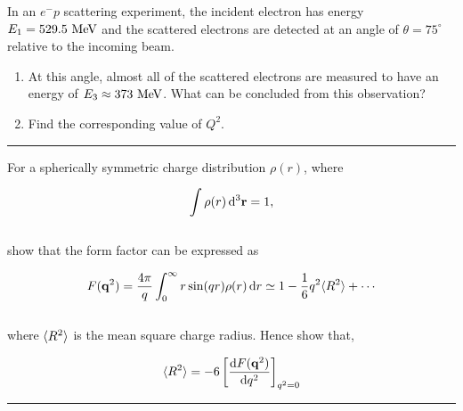 \begin{problem}{7.3}
    In an $e^-p$ scattering experiment, the incident electron has energy $E_1 = 529.5 \text{ MeV}$ and the scattered electrons are detected at an angle of $\theta = 75^\circ$ relative to the incoming beam.
    \begin{enumerate}[label=(\alph*)]
        \item At this angle, almost all of the scattered electrons are measured to have an energy of $E_3 \approx 373 \text{ MeV}$. What can be concluded from this observation?
        \item Find the corresponding value of $Q^2$.
    \end{enumerate}
\end{problem}
\begin{solution}

\end{solution}

\noindent\rule{7in}{1.5pt}


\begin{problem}{7.4}
    For a spherically symmetric charge distribution $\rho(r)$, where

    \begin{align*}
        \int \rho(r) \mathop{}\!\mathrm{d}^3 \mathbf{r} = 1,
    \end{align*}\\
    show that the form factor can be expressed as

    \begin{align*}
        F(\mathbf{q}^2) = \frac{4\pi}{q} \int^\infty_0 r \sin(qr) \rho(r) \mathop{}\!\mathrm{d} r \simeq 1 -\frac{1}{6}q^2\langle R^2 \rangle + \cdots
    \end{align*}\\
    where $\langle R^2 \rangle$  is the mean square charge radius. Hence show that,

    \begin{align*}
        \langle R^2 \rangle = -6 \left[ \frac{\mathop{}\!\mathrm{d} F(\mathbf{q}^2)}{\mathop{}\!\mathrm{d} q^2} \right]_{q^2=0}
    \end{align*}
\end{problem}
\begin{solution}

\end{solution}

\noindent\rule{7in}{1.5pt}


